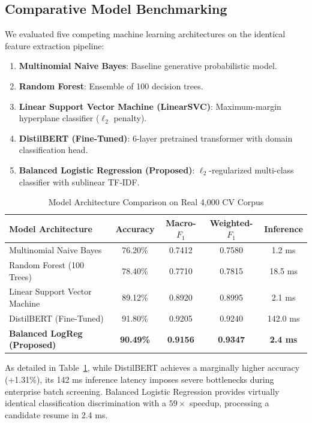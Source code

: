 \documentclass[conference]{IEEEtran}
\begin{document}
\subsection{Comparative Model Benchmarking}
We evaluated five competing machine learning architectures on the identical feature extraction pipeline:
\begin{enumerate}
    \item \textbf{Multinomial Naive Bayes}: Baseline generative probabilistic model.
    \item \textbf{Random Forest}: Ensemble of 100 decision trees.
    \item \textbf{Linear Support Vector Machine (LinearSVC)}: Maximum-margin hyperplane classifier ($\ell_2$ penalty).
    \item \textbf{DistilBERT (Fine-Tuned)}: 6-layer pretrained transformer with domain classification head.
    \item \textbf{Balanced Logistic Regression (Proposed)}: $\ell_2$-regularized multi-class classifier with sublinear TF-IDF.
\end{enumerate}

\begin{table}[h]
\centering
\caption{Model Architecture Comparison on Real 4,000 CV Corpus}
\label{tab:c1_model_comp}
\begin{tabular}{@{}lcccc@{}}
\toprule
\textbf{Model Architecture} & \textbf{Accuracy} & \textbf{Macro-$F_1$} & \textbf{Weighted-$F_1$} & \textbf{Inference} \\
\midrule
Multinomial Naive Bayes & 76.20\% & 0.7412 & 0.7580 & 1.2 ms \\
Random Forest (100 Trees) & 78.40\% & 0.7710 & 0.7815 & 18.5 ms \\
Linear Support Vector Machine & 89.12\% & 0.8920 & 0.8995 & 2.1 ms \\
DistilBERT (Fine-Tuned) & 91.80\% & 0.9205 & 0.9240 & 142.0 ms \\
\textbf{Balanced LogReg (Proposed)} & \textbf{90.49\%} & \textbf{0.9156} & \textbf{0.9347} & \textbf{2.4 ms} \\
\bottomrule
\end{tabular}
\end{table}

As detailed in Table~\ref{tab:c1_model_comp}, while DistilBERT achieves a marginally higher accuracy (+1.31\%), its 142 ms inference latency imposes severe bottlenecks during enterprise batch screening. Balanced Logistic Regression provides virtually identical classification discrimination with a $59\times$ speedup, processing a candidate resume in 2.4 ms.
\end{document}
